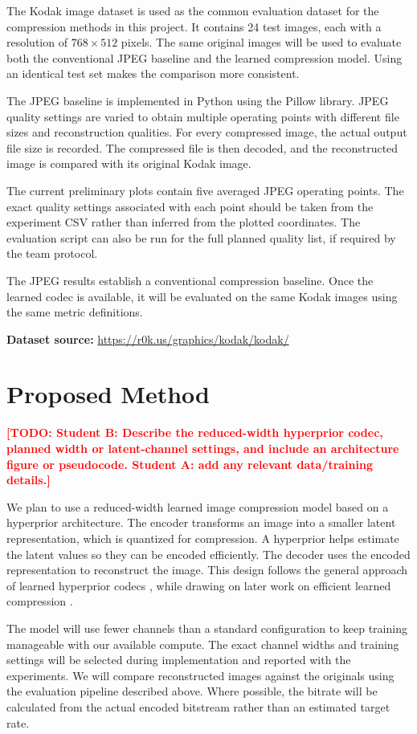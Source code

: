 \documentclass[11pt]{article}
\newcommand{\todo}[1]{\textcolor{red}{\textbf{[TODO: #1]}}}
\begin{document}
The Kodak image dataset is used as the common evaluation dataset for
the compression methods in this project. It contains 24 test images,
each with a resolution of $768 \times 512$ pixels. The same original
images will be used to evaluate both the conventional JPEG baseline
and the learned compression model. Using an identical test set makes
the comparison more consistent.

The JPEG baseline is implemented in Python using the Pillow library.
JPEG quality settings are varied to obtain multiple operating points
with different file sizes and reconstruction qualities. For every
compressed image, the actual output file size is recorded. The
compressed file is then decoded, and the reconstructed image is
compared with its original Kodak image.

The current preliminary plots contain five averaged JPEG operating
points. The exact quality settings associated with each point should
be taken from the experiment CSV rather than inferred from the plotted
coordinates. The evaluation script can also be run for the full planned
quality list, if required by the team protocol.

The JPEG results establish a conventional compression baseline. Once
the learned codec is available, it will be evaluated on the same Kodak
images using the same metric definitions.

\textbf{Dataset source:}
\url{https://r0k.us/graphics/kodak/kodak/}

\section{Proposed Method}
\todo{Student B: Describe the reduced-width hyperprior codec, planned
width or latent-channel settings, and include an architecture figure
or pseudocode. Student A: add any relevant data/training details.}

We plan to use a reduced-width learned image compression model based on
a hyperprior architecture. The encoder transforms an image into a
smaller latent representation, which is quantized for compression. A
hyperprior helps estimate the latent values so they can be encoded
efficiently. The decoder uses the encoded representation to reconstruct
the image. This design follows the general approach of learned
hyperprior codecs \citep{balle2018scalehyperprior}, while drawing on
later work on efficient learned compression \citep{he2022elic}.

The model will use fewer channels than a standard configuration to
keep training manageable with our available compute. The exact channel
widths and training settings will be selected during implementation
and reported with the experiments. We will compare reconstructed
images against the originals using the evaluation pipeline described
above. Where possible, the bitrate will be calculated from the actual
encoded bitstream rather than an estimated target rate.
\end{document}
